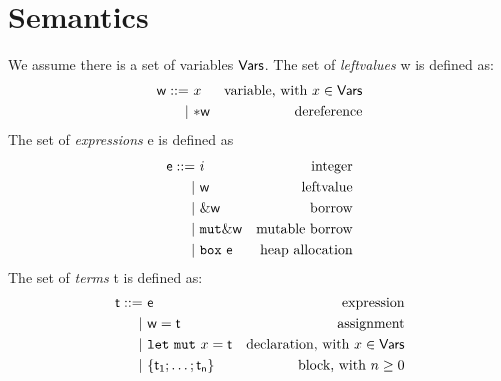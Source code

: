 \section{Semantics}\label{sec:semantics}

\begin{definition}
  We assume there is a set of variables $\mathsf{Vars}$.
  The set of \emph{leftvalues} \textsf{w} is defined as:
  \begin{align*}
    \mathsf{w} ::= &\ x & \text{variable, with $x\in\mathsf{Vars}$}\\
    | &\ \mathtt{*}\mathsf{w} & \text{dereference}
  \end{align*}
  The set of \emph{expressions} \textsf{e} is defined as
  \begin{align*}
    \mathsf{e} ::= &\ i & \text{integer}\\
    | &\ \mathsf{w} & \text{leftvalue}\\
    | &\ \&\mathsf{w} & \text{borrow}\\
    | &\ \mathtt{mut}\&\mathsf{w} & \text{mutable borrow}\\
    | &\ \mathtt{box}\ \mathsf{e} & \text{heap allocation}
  \end{align*}
  The set of \emph{terms} \textsf{t} is defined as:
  \begin{align*}
    \mathsf{t} ::= &\ \mathsf{e} & \text{expression}\\
    | &\ \mathsf{w}=\mathsf{t} & \text{assignment}\\
    | &\ \mathtt{let\ mut}\ x=\mathsf{t} & \text{declaration, with $x\in\mathsf{Vars}$}\\
    | &\ \{\mathsf{t_1};\ldots;\mathsf{t_n}\} & \text{block, with $n\ge 0$}
  \end{align*}
\end{definition}

